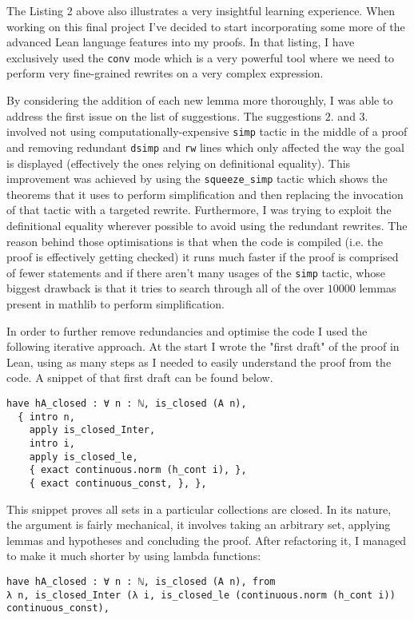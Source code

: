 \documentclass[11pt]{article}
\newenvironment{code}{\captionsetup{type=listing}}{}
\begin{document}
The Listing 2 above also illustrates a very insightful learning experience. When
working on this final project I've decided to start incorporating some more of
the advanced Lean language features into my proofs. In that listing, I have
exclusively used the \texttt{conv} mode which is a very powerful tool where we need
to perform very fine-grained rewrites on a very complex expression.

By considering the addition of each new lemma more thoroughly, I was able to address
the first issue on the list of suggestions. The suggestions $2.$ and  $3.$ involved
not using computationally-expensive \texttt{simp} tactic in the middle of a proof
and removing redundant \texttt{dsimp} and \texttt{rw} lines which only affected the
way the goal is displayed (effectively the ones relying on definitional equality).
This improvement was achieved by using the \texttt{squeeze\_simp} tactic which
shows the theorems that it uses to perform simplification and then replacing the
invocation of that tactic with a targeted rewrite. Furthermore, I was trying to
exploit the definitional equality wherever possible to avoid using the redundant
rewrites. The reason behind those optimisations is that when the code is compiled
(i.e. the proof is effectively getting checked) it runs much faster if the
proof is comprised of fewer statements and if there aren't many usages of the
\texttt{simp} tactic, whose biggest drawback is that it tries to search through
all of the over $10000$ lemmas present in mathlib to perform simplification.

In order to further remove redundancies and optimise the code I used the following
iterative approach. At the start I wrote the "first draft" of the proof in Lean,
using as many steps as I needed to easily understand the proof from the code.
A snippet of that first draft can be found below.

\begin{code}
\begin{verbatim}
have hA_closed : ∀ n : ℕ, is_closed (A n),
  { intro n,
    apply is_closed_Inter,
    intro i,
    apply is_closed_le,
    { exact continuous.norm (h_cont i), },
    { exact continuous_const, }, },
\end{verbatim}
\end{code}

This snippet proves all sets in a particular collections are closed. In its nature,
the argument is fairly mechanical, it involves taking an arbitrary set, applying
lemmas and hypotheses and concluding the proof. After refactoring it, I managed
to make it much shorter by using lambda functions:
\begin{code}
\begin{verbatim}
have hA_closed : ∀ n : ℕ, is_closed (A n), from
λ n, is_closed_Inter (λ i, is_closed_le (continuous.norm (h_cont i)) continuous_const),
\end{verbatim}
\end{code}
\end{document}
